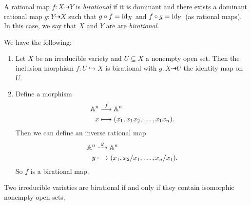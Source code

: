 \begin{definition}
  A rational map $f : X \dashrightarrow Y$
  is \emph{birational} if it is dominant
  and there exists a dominant rational map
  $g : Y \dashrightarrow X$ such that
  $g \circ f = \operatorname{id}_X$ and $f \circ g = \operatorname{id}_Y$
  (as rational maps). In this case,
  we say that $X$ and $Y$ are
  are \emph{birational}.
\end{definition}

\begin{example}
  We have the following:
  \begin{enumerate}
    \item Let $X$ be an irreducible variety
      and $U \subseteq X$ a nonempty open
      set. Then the inclusion morphism
      $f : U \hookrightarrow X$ is
      birational with
      $g : X \dashrightarrow U$
      the identity map on $U$.
    \item Define a morphism
      \begin{align*}
        \mathbb{A}^n &\overset{f}{\longrightarrow} \mathbb{A}^n \\
        x &\longmapsto
        (x_1, x_1 x_2, \dots, x_1 x_n).
      \end{align*}
      Then we can define an inverse
      rational map
      \begin{align*}
        \mathbb{A}^n &\overset{g}{\dashrightarrow} \mathbb{A}^n \\
        y &\longmapsto
        (x_1, x_2 / x_1, \dots, x_n / x_1).
      \end{align*}
      So $f$ is a birational map.
  \end{enumerate}
\end{example}

\begin{prop}
  Two irreducible varieties are birational
  if and only if they contain isomorphic
  nonempty open sets.
\end{prop}

